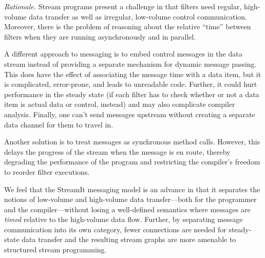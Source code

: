 \emph{Rationale.}  Stream programs present a challenge in that filters
need  regular, high-volume data transfer as well as irregular, low-volume
control communication.  Moreover, there is the problem of reasoning
about the relative ``time'' between filters when they are running
asynchronously and in parallel.

A different approach to messaging  is to embed control messages in the
data  stream instead  of providing  a separate  mechanism  for dynamic
message passing.  This does have the effect of associating the message
time with a  data item, but it is  complicated, error-prone, and leads
to unreadable code.  Further, it  could hurt performance in the steady
state  (if each filter  has to  check whether  or not  a data  item is
actual  data or  control, instead)  and may  also  complicate compiler
analysis.  Finally, one can't  send messages upstream without creating
a separate data channel for them to travel in.

Another solution is to treat messages as synchronous method calls.
However, this delays the progress of the stream when the message is en
route, thereby degrading the performance of the program and
restricting the compiler's freedom to reorder filter executions.  

We feel that the StreamIt messaging model is an advance in that it
separates the notions of low-volume and high-volume data transfer---both
for the programmer and the compiler---without losing a well-defined
semantics where messages are \emph{timed} relative to the high-volume
data flow.  Further, by separating message communication into its own
category, fewer connections are needed for steady-state data transfer
and the resulting stream graphs are more amenable to structured stream
programming.



